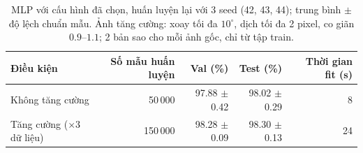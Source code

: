 \begin{table}[H]\centering\small
\begin{tabular}{lrrrr}
\toprule
Điều kiện & Số mẫu huấn luyện & Val (\%) & Test (\%) & Thời gian fit (s) \\
\midrule
Không tăng cường & 50\,000 & 97.88 $\pm$ 0.42 & 98.02 $\pm$ 0.29 & 8 \\
Tăng cường ($\times3$ dữ liệu) & 150\,000 & 98.28 $\pm$ 0.09 & 98.30 $\pm$ 0.13 & 24 \\
\bottomrule
\end{tabular}
\caption{MLP với cấu hình đã chọn, huấn luyện lại với 3 seed (42, 43, 44); trung bình $\pm$ độ lệch chuẩn mẫu. Ảnh tăng cường: xoay tối đa $10^\circ$, dịch tối đa 2 pixel, co giãn $0.9$--$1.1$; 2 bản sao cho mỗi ảnh gốc, chỉ từ tập train.}
\label{tab:augmentation}
\end{table}
